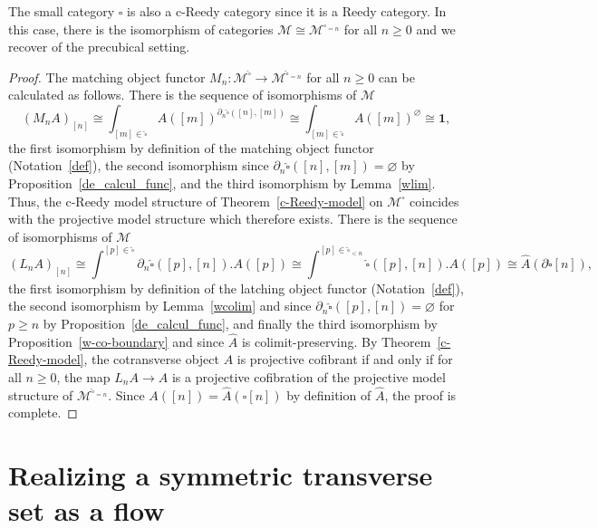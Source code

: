 \documentclass[a4paper,12pt]{amsart}
\newcommand{\de}{\partial}
\newcommand{\bpf}{\begin{proof}}
\newcommand{\epf}{\end{proof}}
\theoremstyle{definition}
\newcommand{\iso}{\cong}
\renewcommand{\geq}{\geqslant}
\begin{document}
The small category $\square$ is also a c-Reedy category since it is a Reedy category. In this case, there is the isomorphism of categories $\mathcal{M}\iso \mathcal{M}^{{\square}_{=n}}$ for all $n\geq 0$ and we recover \cite[Proposition~2.3.1]{realization} of the precubical setting.

\bpf
The matching object functor $M_n:\mathcal{M}^{\widehat{\square}}\to \mathcal{M}^{\widehat{\square}_{=n}}$ for all $n\geq 0$ can be calculated as follows. There is the sequence of isomorphisms of $\mathcal{M}$
\[
(M_nA)_{[n]}\iso \int_{[m]\in \widehat{\square}} A([m])^{\de_n\widehat{\square}([n],[m])} \iso \int_{[m]\in \widehat{\square}} A([m])^{\varnothing} \iso \mathbf{1},
\] 
the first isomorphism by definition of the matching object functor (Notation~\ref{def}), the second isomorphism since $\de_n\widehat{\square}([n],[m])=\varnothing$ by Proposition~\ref{de_calcul_func}, and the third isomorphism by Lemma~\ref{wlim}. Thus, the c-Reedy model structure of Theorem~\ref{c-Reedy-model} on $\mathcal{M}^{\widehat{\square}}$ coincides with the projective model structure which therefore exists. There is the sequence of isomorphisms of $\mathcal{M}$
\[
(L_nA)_{[n]} \iso \int^{[p]\in \widehat{\square}}\de_n\widehat{\square}([p],[n]) . A([p]) \iso \int^{[p]\in \widehat{\square}_{<n}}\widehat{\square}([p],[n]) . A([p]) \iso \widehat{A}(\de\widehat{\square}[n]),
\]
the first isomorphism by definition of the latching object functor (Notation~\ref{def}), the second isomorphism by Lemma~\ref{wcolim} and since $\de_n\widehat{\square}([p],[n])=\varnothing$ for $p\geq n$ by Proposition~\ref{de_calcul_func}, and finally the third isomorphism by Proposition~\ref{w-co-boundary} and since $\widehat{A}$ is colimit-preserving. By Theorem~\ref{c-Reedy-model}, the cotransverse object $A$ is projective cofibrant if and only if for all $n\geq 0$, the map $L_nA\to A$ is a projective cofibration of the projective model structure of $\mathcal{M}^{\widehat{\square}_{=n}}$. Since $A([n]) = \widehat{A}(\widehat{\square}[n])$ by definition of $\widehat{A}$, the proof is complete. 
\epf


\section{Realizing a symmetric transverse set as a flow}
\label{rea_sec}
\end{document}
